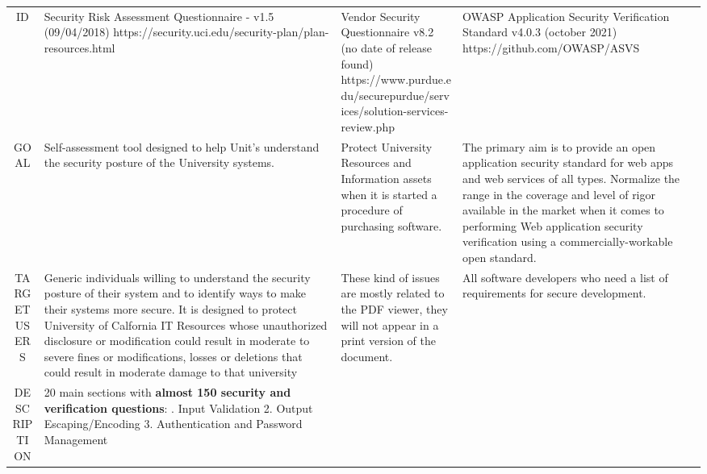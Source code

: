 \documentclass[paper=letter, fontsize=12pt]{article}
\begin{document}
\begin{landscape}
\begin{itemize}
 \end{itemize}
\setlength\LTleft{-2.5cm}
        \begin{longtable}{| c | L{7cm} | L{7cm} | L{7cm} |}
            \hline 
            \makecell{} &   &  &  \\
            \hline
            \endhead
           ID & Security Risk Assessment Questionnaire - v1.5 (09/04/2018) \newline https://security.uci.edu/security-plan/plan-resources.html & Vendor Security Questionnaire v8.2 (no date of release found) \newline https://www.purdue.edu/securepurdue/\newline services/solution-services-review.php & OWASP Application Security Verification Standard \newline v4.0.3 (october 2021) \newline https://github.com/OWASP/ASVS \\
           \hline
            GOAL & Self-assessment tool designed to help Unit’s understand the security posture of the University systems.& Protect University Resources and Information assets when it is started a procedure of purchasing software. & The primary aim is to provide an open application security standard for web apps and web services of all types. Normalize the range in the coverage and level of rigor available in the market when it comes to performing Web application security verification using a commercially-workable open standard. \\
          \hline
           TARGET USERS & Generic individuals willing to  understand the security posture of their system and to identify ways to make their systems more secure. It is designed to protect University of Calfornia IT Resources whose unauthorized disclosure or modification could result in moderate to severe fines or modifications, losses or deletions that could result in moderate damage to that university & These kind of issues are mostly related to the PDF viewer, they will not appear in a print version of the document. & All software developers who need a list of requirements for secure development. \\
           \hline
           DESCRIPTION & 20 main sections with  \textbf{almost 150 security and verification questions}: . Input Validation
	2. Output Escaping/Encoding
	3. Authentication and Password Management				

\end{longtable}
\end{landscape}
\end{document}
